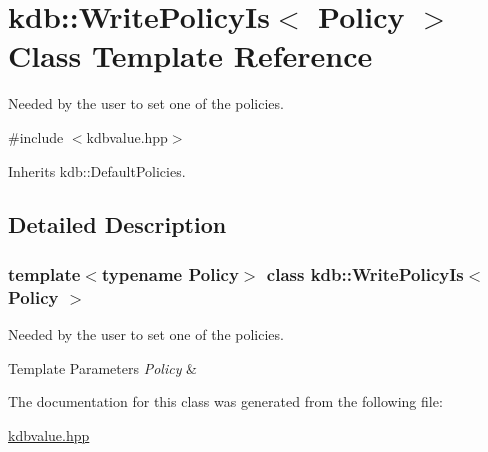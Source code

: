 \hypertarget{classkdb_1_1WritePolicyIs}{}\section{kdb\+:\+:Write\+Policy\+Is$<$ Policy $>$ Class Template Reference}
\label{classkdb_1_1WritePolicyIs}


Needed by the user to set one of the policies.  




{\ttfamily \#include $<$kdbvalue.\+hpp$>$}



Inherits kdb\+::\+Default\+Policies.



\subsection{Detailed Description}
\subsubsection*{template$<$typename Policy$>$\newline
class kdb\+::\+Write\+Policy\+Is$<$ Policy $>$}

Needed by the user to set one of the policies. 


\begin{DoxyTemplParams}{Template Parameters}
{\em Policy} & \\
\hline
\end{DoxyTemplParams}


The documentation for this class was generated from the following file\+:\begin{DoxyCompactItemize}
\item 
\hyperlink{kdbvalue_8hpp}{kdbvalue.\+hpp}\end{DoxyCompactItemize}
